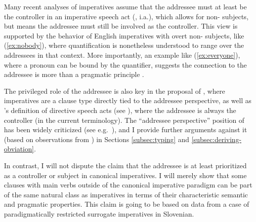 \documentclass[output=paper,colorlinks,citecolor=brown]{langscibook}
\begin{document}
Many recent analyses of imperatives assume that the addressee must at least be the controller in an imperative speech act (\citealt[][]{portnerSALT,portner07,zanuttini08,zpp12}, i.a.), which allows for non-\snd{} subjects, but means the addressee must still be involved as the controller.  This view is supported by the behavior of English imperatives with overt non-\snd{} subjects, like (\ref{ex:nobody}), where quantification is nonetheless understood to range over the addressees in that context. More importantly, an example like (\ref{ex:everyone}), where a \snd{} pronoun can be bound by the quantifier, suggests the connection to the addressee is more than a pragmatic principle \citep[see][]{zanuttini08,zpp12}.

\ea {}
\z\z     

\noindent The privileged role of the addressee is also key in the proposal of \textcite{speastenny03}, where imperatives are a clause type directly tied to the addressee perspective, as well as \citeauthor{searle76}'s definition of directive speech acts (see ), where the addressee is always the controller (in the current terminology). The ``addressee perspective'' position of \citeauthor{speastenny03} has been widely criticized (see e.g.\ \citealt{gaertner-steinbach06,zu18}), and I provide further arguments against it (based on observations from \citealt{Stegovec2017,stegovec19}) in Sections \ref{subsec:typing} and \ref{subsec:deriving-obviation}. 

In contrast, I will not dispute the claim that the addressee is at least prioritized as a controller or subject in canonical imperatives. I will merely show that some clauses with main verbs outside of the canonical imperative paradigm can be part of the same natural class as imperatives in terms of their characteristic semantic and pragmatic properties. This claim is going to be based on data from a case of paradigmatically restricted surrogate imperatives in Slovenian.
\end{document}
